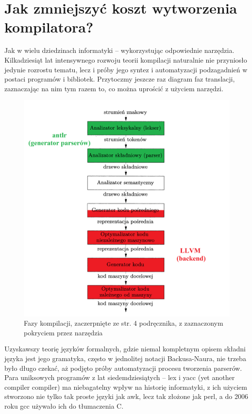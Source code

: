 

\section{Jak zmniejszyć koszt wytworzenia kompilatora?}
Jak w wielu dziedzinach informatyki – wykorzystując odpowiednie narzędzia. Kilkadziesiąt lat intensywnego rozwoju teorii kompilacji naturalnie nie przyniosło jedynie rozrostu tematu, lecz i próby jego syntez i automatyzacji podzagadnień w postaci programów i bibliotek. Przytoczmy jeszcze raz diagram faz translacji, zaznaczając na nim tym razem to, co można uprościć z użyciem narzędzi.
\begin{figure}[H]
    \centering
    \includegraphics[height=0.8\linewidth]{images/wstep/fazy_kompilacji.png_bin_antlr_llvm_podpisany_popr.png}
    \caption{Fazy kompilacji, zaczerpnięte ze str. 4 podręcznika\cite{DRAGON_BOOK}, z zaznaczonym pokryciem przez narzędzia}
\end{figure}


Uzyskawszy teorię języków formalnych, gdzie niemal kompletnym opisem składni języka jest jego gramatyka, często w jednolitej notacji Backusa-Naura, nie trzeba było długo czekać, aż podjęto próby automatyzacji procesu tworzenia parserów. Para uniksowych programów z lat siedemdziesiątych – lex i yacc (yet another compiler compiler) ma niebagatelny wpływ na historię informatyki, z ich użyciem stworzono nie tylko tak proste języki jak awk, lecz tak złożone jak perl\cite{parsing_timeline_kegler}, a do 2006 roku gcc używało ich do tłumaczenia C.\cite{gcc_2006_release_note}


